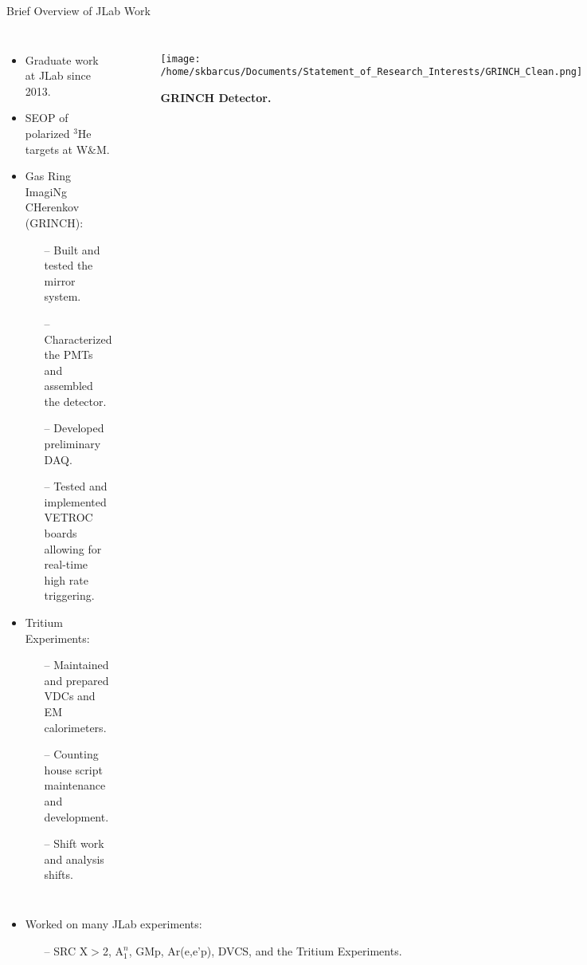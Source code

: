 \documentclass[10pt]{beamer}
\begin{document}
\begin{frame}{Brief Overview of JLab Work}
  	\begin{columns}[T,onlytextwidth]

	\vspace{-2mm}
	\begin{itemize}
		\item Graduate work at JLab since 2013.
		\pause
		\item SEOP of \alert{polarized $^3$He targets} at W$\&$M.
		\pause
		\item \alert{Gas Ring ImagiNg CHerenkov (GRINCH)}:
			\begin{itemize}
				\item[--] Built and tested the \alert{mirror system}.
				\item[--] Characterized the \alert{PMTs} and assembled the detector.
				\item[--] Developed preliminary \alert{DAQ}.
				\item[--] Tested and implemented \alert{VETROC} boards allowing for real-time high rate triggering. 
			\end{itemize}
		\pause
		\item \alert{Tritium Experiments}:
			\begin{itemize}
				\item[--] Maintained and prepared \alert{VDCs and EM calorimeters}.
				\item[--] Counting house \alert{script maintenance and development}.
				\item[--] \alert{Shift work and analysis shifts}.
			\end{itemize}

	\end{itemize}
	
		\vspace{7mm}
		\begin{figure}[!ht]
		\begin{center}
		\texttt{[image: /home/skbarcus/Documents/Statement\_of\_Research\_Interests/GRINCH\_Clean.png]}
		\end{center}
		\caption{
		{\bf{GRINCH Detector.}} }
		\label{fig:GRINCH}
		\end{figure}
	\end{columns}
	
	\begin{itemize}
		\pause
		\item Worked on many JLab experiments:
			\begin{itemize}
				\item[--] \alert{SRC X$>$2}, \alert{A$_1^n$}, GMp, Ar(e,e'p), DVCS, and the \alert{Tritium Experiments}.
			\end{itemize}
	\end{itemize}
	
\end{frame}
\end{document}
